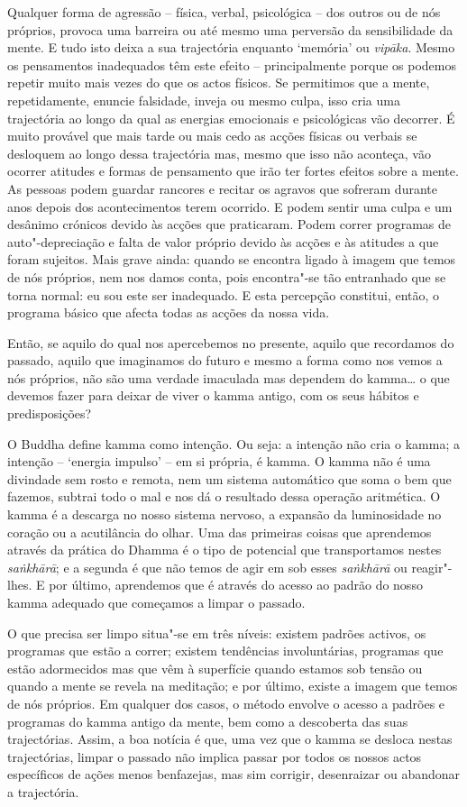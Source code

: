 Qualquer forma de agressão -- física, verbal, psicológica -- dos outros ou de
nós próprios, provoca uma barreira ou até mesmo uma perversão da sensibilidade
da mente. E tudo isto deixa a sua trajectória enquanto `memória' ou
\emph{vipāka}. Mesmo os pensamentos inadequados têm este efeito --
principalmente porque os podemos repetir muito mais vezes do que os actos
físicos. Se permitimos que a mente, repetidamente, enuncie falsidade, inveja ou
mesmo culpa, isso cria uma trajectória ao longo da qual as energias emocionais e
psicológicas vão decorrer. É muito provável que mais tarde ou mais cedo as
acções físicas ou verbais se desloquem ao longo dessa trajectória mas, mesmo que
isso não aconteça, vão ocorrer atitudes e formas de pensamento que irão ter
fortes efeitos sobre a mente. As pessoas podem guardar rancores e recitar os
agravos que sofreram durante anos depois dos acontecimentos terem ocorrido. E
podem sentir uma culpa e um desânimo crónicos devido às acções que praticaram.
Podem correr programas de auto"-depreciação e falta de valor próprio devido às
acções e às atitudes a que foram sujeitos. Mais grave ainda: quando se encontra
ligado à imagem que temos de nós próprios, nem nos damos conta, pois encontra"-se
tão entranhado que se torna normal: eu sou este ser inadequado. E esta percepção
constitui, então, o programa básico que afecta todas as acções da nossa vida.

Então, se aquilo do qual nos apercebemos no presente, aquilo que recordamos do
passado, aquilo que imaginamos do futuro e mesmo a forma como nos vemos a nós
próprios, não são uma verdade imaculada mas dependem do kamma\ldots{} o que devemos
fazer para deixar de viver o kamma antigo, com os seus hábitos e predisposições?

O Buddha define kamma como intenção. Ou seja: a intenção não cria o kamma; a
intenção -- `energia impulso' -- em si própria, é kamma. O kamma não é uma
divindade sem rosto e remota, nem um sistema automático que soma o bem que
fazemos, subtrai todo o mal e nos dá o resultado dessa operação aritmética. O
kamma é a descarga no nosso sistema nervoso, a expansão da luminosidade no
coração ou a acutilância do olhar. Uma das primeiras coisas que aprendemos
através da prática do Dhamma é o tipo de potencial que transportamos nestes
\emph{saṅkhārā}; e a segunda é que não temos de agir em sob esses
\emph{saṅkhārā} ou reagir"-lhes. E por último, aprendemos que é através do acesso
ao padrão do nosso kamma adequado que começamos a limpar o passado.

O que precisa ser limpo situa"-se em três níveis: existem padrões activos, os
programas que estão a correr; existem tendências involuntárias, programas que
estão adormecidos mas que vêm à superfície quando estamos sob tensão ou quando a
mente se revela na meditação; e por último, existe a imagem que temos de nós
próprios. Em qualquer dos casos, o método envolve o acesso a padrões e programas
do kamma antigo da mente, bem como a descoberta das suas trajectórias. Assim, a
boa notícia é que, uma vez que o kamma se desloca nestas trajectórias, limpar o
passado não implica passar por todos os nossos actos específicos de ações menos
benfazejas, mas sim corrigir, desenraizar ou abandonar a trajectória.


